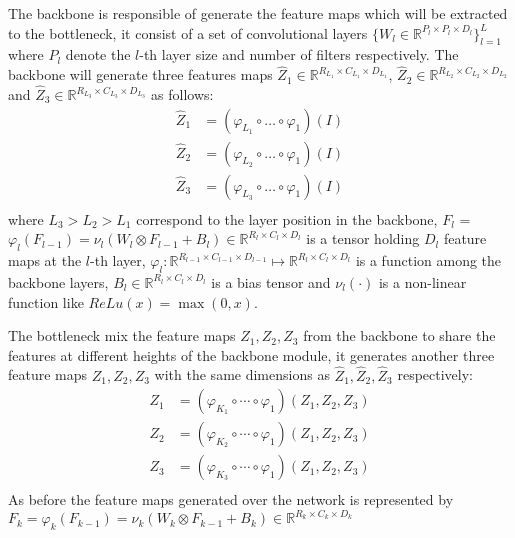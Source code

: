 \documentclass{IEEEtran}
\begin{document}
The backbone is responsible of generate the feature maps which will be extracted
to the bottleneck, it consist of a set of convolutional layers $\{W_l \in
\mathbb{R}^{P_l \times P_l \times D_l}\}_{l=1}^L$ where $P_l$ denote the $l$-th
layer size and number of filters respectively. The backbone will generate three features maps
$\hat{Z}_1 \in \mathbb{R}^{R_{L_1} \times C_{L_1} \times D_{L_1}}$, $\hat{Z}_2
\in \mathbb{R}^{R_{L_2} \times C_{L_2} \times D_{L_2}}$ and $\hat{Z}_3 \in
\mathbb{R}^{R_{L_3} \times C_{L_3} \times D_{L_3}}$ as follows:
\begin{equation}
    \begin{array}{cc}
        \hat{Z}_1 &= (\varphi_{L_1} \circ \dots \circ \varphi_{1})(I) \\
        \hat{Z}_2 &= (\varphi_{L_2} \circ \dots \circ \varphi_{1})(I) \\ 
        \hat{Z}_3 &= (\varphi_{L_3} \circ \dots \circ \varphi_{1})(I) \\ 
    \end{array}
    \label{eq:Backbone}
\end{equation}
where $L_3 > L_2 > L_1$ correspond to the layer position in the backbone, $F_l$
= $\varphi_l(F_{l-1}) = \nu_l(W_l \otimes F_{l-1} + B_l) \in \mathbb{R}^{R_l
\times C_l \times D_l}$ is a tensor holding $D_l$ feature maps at the $l$-th
layer, $\varphi_l : \mathbb{R}^{R_{l-1} \times C_{l-1} \times D_{l-1}} \mapsto
\mathbb{R}^{R_{l} \times C_{l} \times D_{l}}$ is a function among the backbone
layers, $B_l \in \mathbb{R}^{R_{l} \times C_{l} \times D_{l}}$ is a bias tensor
and $\nu_l(\cdot)$ is a non-linear function like $ReLu(x) = \max(0, x)$.\par

The bottleneck mix the feature maps $Z_1, Z_2, Z_3$ from the backbone to share
the features at different heights of the backbone module, it generates another
three feature maps $Z_1, Z_2, Z_3$ with the same dimensions as $\hat{Z}_1,
\hat{Z}_2, \hat{Z}_3$ respectively:
\begin{equation}
    \begin{split}
        Z_1 &= (\varphi_{K_1} \circ \cdots \circ \varphi_1)(Z_1, Z_2, Z_3)\\
        Z_2 &= (\varphi_{K_2} \circ \cdots \circ \varphi_1)(Z_1, Z_2, Z_3)\\
        Z_3 &= (\varphi_{K_3} \circ \cdots \circ \varphi_1)(Z_1, Z_2, Z_3)\\
    \end{split}
    \label{eq:bottleneck}
\end{equation}
As before the feature maps generated over the network is represented by $F_k =
\varphi_k(F_{k-1}) = \nu_k(W_k \otimes F_{k-1} + B_k) \in \mathbb{R}^{R_k \times
C_k \times D_k}$
\end{document}
